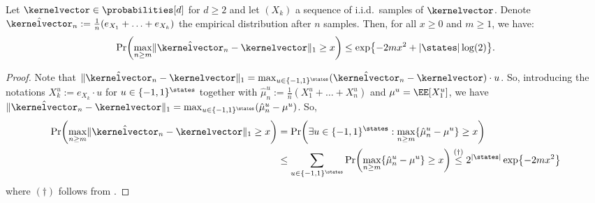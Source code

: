 \documentclass[preprint,cleveref,12pt]{colt2025}
\DeclarePairedDelimiter{\braces}{\{}{\}}	%
\DeclarePairedDelimiter{\parens}{(}{)}	%
\DeclarePairedDelimiter{\abs}{\lvert}{\rvert}	%
\DeclarePairedDelimiter{\norm}{\lVert}{\rVert}	%
\def\kernel{\kernelvector}
\begin{document}
    \begin{lemma}
    \label{lemma_weissman_maximal}
        Let $\kernel \in \probabilities[d]$ for $d \ge 2$ and let $(X_k)$ a sequence of i.i.d.~samples of $\kernel$.
        Denote $\hat{\kernel}_n := \frac 1n (e_{X_1} + \ldots + e_{X_k})$ the empirical distribution after $n$ samples. 
        Then, for all $x \ge 0$ and $m \ge 1$, we have:
        \begin{equation*}
            \Pr \parens*{
                \max_{n \ge m}
                \norm{\hat{\kernel}_n - \kernel}_1
                \ge
                x
            }
            \le
            \exp \braces*{-2 m x^2 + \abs{\states} \log(2)}
            .
        \end{equation*}
    \end{lemma}
    \begin{proof}
        Note that $\norm{\hat{\kernel}_n - \kernel}_1 = \max_{u \in \braces{-1,1}^\states} (\hat{\kernel}_n - \kernel) \cdot u$.
        So, introducing the notations $X_k^u := e_{X_k} \cdot u$ for $u \in \braces{-1, 1}^\states$ together with $\hat{\mu}_n^u := \frac 1n(X_1^u + \ldots + X_n^u)$ and $\mu^u = \EE[X_1^u]$, we have $\norm{\hat{\kernel}_n - \kernel}_1 = \max_{u \in \braces{-1,1}^\states} (\hat{\mu}_n^u - \mu^u)$.
        So,
        \begin{align*}
            \Pr \parens*{
                \max_{n \ge m}
                \norm{\hat{\kernel}_n - \kernel}_1
                \ge
                x
            }
            & =
            \Pr \parens*{
                \exists u \in \braces{-1,1}^\states:
                \max_{n \ge m}
                \braces*{\hat{\mu}_n^u - \mu^u}
                \ge 
                x
            }
            \\
            & \le 
            \sum_{u \in \braces{-1,1}^\states}
            \Pr \parens*{
                \max_{n \ge m}
                \braces*{\hat{\mu}_n^u - \mu^u}
                \ge 
                x
            }
            \overset{(\dagger)}\le
            2^{\abs{\states}} \exp\braces*{-2m x^2}
        \end{align*}
        where $(\dagger)$ follows from .
    \end{proof}
\end{document}
